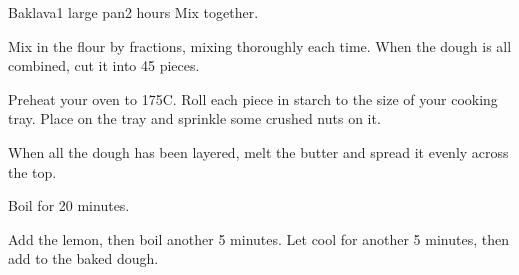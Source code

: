 \documentclass[../Cookbook.tex]{subfiles}
\begin{document}
\begin{recipe}[Baklava]{Baklava}{1 large pan}{2 hours}
Mix together.

Mix in the flour by fractions, mixing thoroughly each time.
When the dough is all combined, cut it into 45 pieces.

Preheat your oven to 175\0C.
Roll each piece in starch to the size of your cooking tray.
Place on the tray and sprinkle some crushed nuts on it.

When all the dough has been layered, melt the butter and spread it evenly across the top.

Boil for 20 minutes.

Add the lemon, then boil another 5 minutes. Let cool for another 5 minutes, then add to the baked dough.

\end{recipe}
\end{document}

